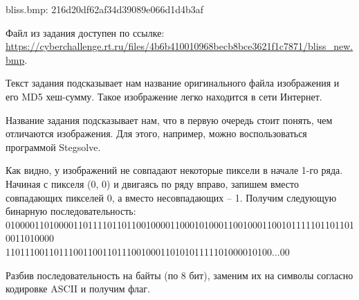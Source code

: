 
bliss.bmp: 216d20df62af34d39089e066d1d4b3af

Файл из задания доступен по ссылке: \url{https://cyberchallenge.rt.ru/files/4b6b410010968becb8bce3621f1c7871/bliss_new.bmp}.

\solutionSection

Текст задания подсказывает нам название оригинального файла изображения и его MD5 хеш-сумму. Такое изображение легко находится в сети Интернет.

Название задания подсказывает нам, что в первую очередь стоит понять, чем отличаются изображения. Для этого, например, можно воспользоваться программой Stegsolve.


Как видно, у изображений не совпадают некоторые пиксели в начале 1-го ряда. Начиная с пикселя (0, 0) и двигаясь по ряду вправо, запишем вместо совпадающих пикселей 0, а вместо несовпадающих – 1. Получим следующую бинарную последовательность:\\

0100001101000011011110110110010000110001010001100100011001011111011011010011010000\\1101110011011100110011011100100011010101111101000010100...00

Разбив последовательность на байты (по 8 бит), заменим их на символы согласно кодировке ASCII и получим флаг.

